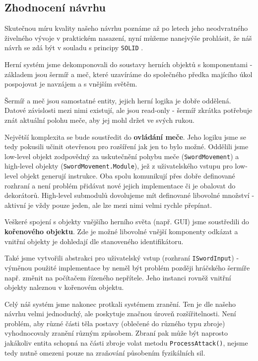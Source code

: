 \subsection{Zhodnocení návrhu} 

Skutečnou míru kvality našeho návrhu poznáme až po letech jeho neodvratného živelného vývoje v praktickém nasazení, nyní můžeme nanejvýše prohlásit, že náš návrh se zdá být v souladu s principy \texttt{SOLID} \cite{CleanArchitectureSOLID}. 

Herní systém jsme dekomponovali do soustavy herních objektů s komponentami - základem jsou šermíř a meč, které uzavíráme do společného předka majícího úkol pospojovat je navzájem a s vnějším světěm. 

Šermíř a meč jsou samostatné entity, jejich herní logika je dobře oddělená. Datové závislosti mezi nimi existují, ale jsou read-only - šermíř zkrátka potřebuje znát aktuální polohu meče, aby jej mohl držet ve svých rukou.

Největší komplexita se bude soustředit do \textbf{ovládání meče}. Jeho logiku jsme se tedy pokusili učinit otevřenou pro rozšíření jak jen to bylo možné. Oddělili jsme low-level objekt zodpovědný za uskutečnění pohybu meče (\texttt{SwordMovement}) a high-level objekty (\texttt{SwordMovement.Module}), jež z uživatelského vstupu pro low-level objekt generují instrukce. Oba spolu komunikují přes dobře definované rozhraní a není problém přidávat nové jejich implementace či je obalovat do dekorátorů. High-level submodulů dovolujeme mít definované libovolné množství - aktivní je vždy pouze jeden, ale lze mezi nimi velmi rychle přepínat. 

Veškeré spojení s objekty vnějšího herního světa (např. GUI) jsme soustředili do \textbf{kořenového objektu}. Zde je možné libovolné vnější komponenty odkázat a vnitřní objekty je dohledají dle stanoveného identifikátoru.

Také jsme vytvořili abstrakci pro uživatelský vstup (rozhraní \texttt{ISwordInput}) - výměnou použité implementace by neměl být problém později hráčského šermíře např. změnit na počítačem řízeného nepřítele. Jeho instanci rovněž vnitřní objekty naleznou v kořenovém objektu. 

Celý náš systém jsme nakonec protkali systémem zranění. Ten je dle našeho návrhu velmi jednoduchý, ale poskytuje značnou úroveň rozšířitelnosti. Není problém, aby různé části těla postavy (oblečené do různého typu zbroje) vyhodnocovaly zranění různým způsobem. Zbraní pak může být naprosto jakákoliv entita schopná na části zbroje volat metodu \texttt{ProcessAttack()}, nejsme tedy nutně omezeni pouze na zraňování působením fyzikálních sil.


